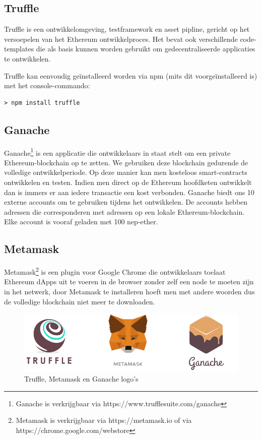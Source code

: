 \subsection{Truffle}
Truffle is een ontwikkelomgeving, testframework en asset pipline, gericht op het versoepelen van het Ethereum ontwikkelproces. Het bevat ook verschillende code-templates die als basis kunnen worden gebruikt om gedecentraliseerde applicaties te ontwikkelen.

Truffle kan eenvoudig geïnstalleerd worden via npm (mits dit  voorgeïnstalleerd is) met het console-commando:
 \lstset{language=bash}
\begin{lstlisting}[numbers=none]
> npm install truffle
\end{lstlisting}
\subsection{Ganache}
Ganache\footnote{Ganache is verkrijgbaar via https://www.trufflesuite.com/ganache} is een applicatie die ontwikkelaars in staat stelt om een private Ethereum-blockchain op te zetten. We gebruiken deze blockchain gedurende de volledige ontwikkelperiode. Op deze manier kan men kosteloos smart-contracts ontwikkelen en testen. Indien men direct op de Ethereum hoofdketen ontwikkelt dan is immers er aan iedere transactie  een kost verbonden. Ganache biedt ons 10 externe accounts om te gebruiken tijdens het ontwikkelen. De accounts hebben adressen die corresponderen met adressen op een lokale Ethereum-blockchain. Elke account is vooraf geladen met 100 nep-ether.

\subsection{Metamask}
Metamask\footnote{Metamask is verkrijgbaar via https://metamask.io of via https://chrome.google.com/webstore} is een plugin voor Google Chrome die ontwikkelaars toelaat Ethereum dApps uit te voeren in de browser zonder zelf een node te moeten zijn in het netwerk, door Metamask te installeren hoeft men met andere woorden dus de volledige blockchain niet meer te downloaden.

\begin{figure}
	\includegraphics[width=\linewidth]{img/metamask-truffle-ganache.png}
	\caption{Truffle, Metamask en Ganache logo's}
	\label{fig:metamask-truffle-ganache}
\end{figure}

